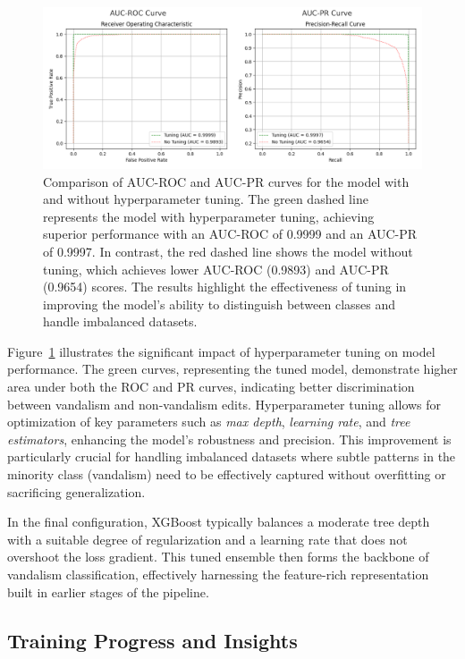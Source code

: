 \documentclass[
    13pt, %
    a4paper, %
    listof=totoc, %
    bibliography=totoc, %
    index=totoc, %
    headsepline
]{scrreprt}
\begin{document}
\noindent
\begin{figure}[htbp]
    \centering
    \includegraphics[width=1.0\textwidth]{hyperparameter_tuning_plot.png}
    \caption{Comparison of AUC-ROC and AUC-PR curves for the model with and without hyperparameter tuning. The green dashed line represents the model with hyperparameter tuning, achieving superior performance with an AUC-ROC of 0.9999 and an AUC-PR of 0.9997. In contrast, the red dashed line shows the model without tuning, which achieves lower AUC-ROC (0.9893) and AUC-PR (0.9654) scores. The results highlight the effectiveness of tuning in improving the model's ability to distinguish between classes and handle imbalanced datasets.}
    \label{fig:hyperparam_tuning_plot}
\end{figure}

\noindent
Figure~\ref{fig:hyperparam_tuning_plot} illustrates the significant impact of hyperparameter tuning on model performance. The green curves, representing the tuned model, demonstrate higher area under both the ROC and PR curves, indicating better discrimination between vandalism and non-vandalism edits. Hyperparameter tuning allows for optimization of key parameters such as \textit{max depth}, \textit{learning rate}, and \textit{tree estimators}, enhancing the model's robustness and precision. This improvement is particularly crucial for handling imbalanced datasets where subtle patterns in the minority class (vandalism) need to be effectively captured without overfitting or sacrificing generalization. 

In the final configuration, XGBoost typically balances a moderate tree depth with a suitable degree of regularization and a learning rate that does not overshoot the loss gradient. This tuned ensemble then forms the backbone of vandalism classification, effectively harnessing the feature-rich representation built in earlier stages of the pipeline.

\subsection{Training Progress and Insights}
\label{subsec:training_progress}
\end{document}

